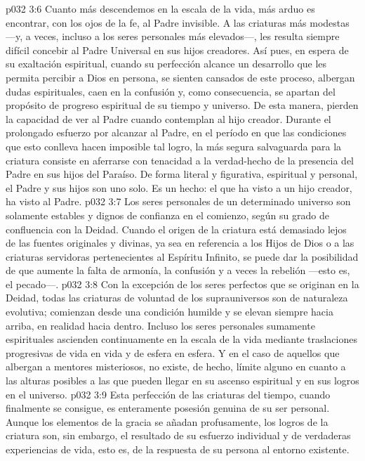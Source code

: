 \vs p032 3:6 Cuanto más descendemos en la escala de la vida, más arduo es encontrar, con los ojos de la fe, al Padre invisible. A las criaturas más modestas ---y, a veces, incluso a los seres personales más elevados---, les resulta siempre difícil concebir al Padre Universal en sus hijos creadores. Así pues, en espera de su exaltación espiritual, cuando su perfección alcance un desarrollo que les permita percibir a Dios en persona, se sienten cansados de este proceso, albergan dudas espirituales, caen en la confusión y, como consecuencia, se apartan del propósito de progreso espiritual de su tiempo y universo. De esta manera, pierden la capacidad de ver al Padre cuando contemplan al hijo creador. Durante el prolongado esfuerzo por alcanzar al Padre, en el período en que las condiciones que esto conlleva hacen imposible tal logro, la más segura salvaguarda para la criatura consiste en aferrarse con tenacidad a la verdad\hyp{}hecho de la presencia del Padre en sus hijos del Paraíso. De forma literal y figurativa, espiritual y personal, el Padre y sus hijos son uno solo. Es un hecho: el que ha visto a un hijo creador, ha visto al Padre.
\vs p032 3:7 \pc Los seres personales de un determinado universo son solamente estables y dignos de confianza en el comienzo, según su grado de confluencia con la Deidad. Cuando el origen de la criatura está demasiado lejos de las fuentes originales y divinas, ya sea en referencia a los Hijos de Dios o a las criaturas servidoras pertenecientes al Espíritu Infinito, se puede dar la posibilidad de que aumente la falta de armonía, la confusión y a veces la rebelión ---esto es, el pecado---.
\vs p032 3:8 \pc Con la excepción de los seres perfectos que se originan en la Deidad, todas las criaturas de voluntad de los suprauniversos son de naturaleza evolutiva; comienzan desde una condición humilde y se elevan siempre hacia arriba, en realidad hacia dentro. Incluso los seres personales sumamente espirituales ascienden continuamente en la escala de la vida mediante traslaciones progresivas de vida en vida y de esfera en esfera. Y en el caso de aquellos que albergan a mentores misteriosos, no existe, de hecho, límite alguno en cuanto a las alturas posibles a las que pueden llegar en su ascenso espiritual y en sus logros en el universo.
\vs p032 3:9 Esta perfección de las criaturas del tiempo, cuando finalmente se consigue, es enteramente posesión genuina de su ser personal. Aunque los elementos de la gracia se añadan profusamente, los logros de la criatura son, sin embargo, el resultado de su esfuerzo individual y de verdaderas experiencias de vida, esto es, de la respuesta de su persona al entorno existente.

